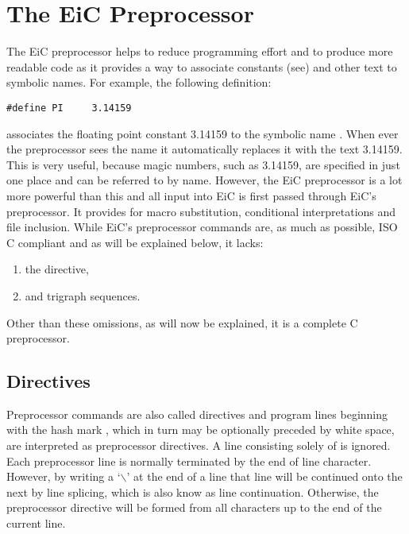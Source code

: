 \chapter{The EiC Preprocessor}
\label{chp:Preprocessor}
\label{sec:preprocessor} 


The EiC preprocessor helps to reduce programming effort and to
produce more readable code as it provides a way to associate
constants (see) and other text to symbolic names. For example,
the following definition:
\begin{production}
\begin{verbatim}
#define PI     3.14159
\end{verbatim}
\end{production}

associates the floating point constant 3.14159 to the symbolic name
. When ever the preprocessor sees the name  it automatically
replaces it with the text 3.14159. This is very useful, because magic
numbers, such as 3.14159, are specified in just
one place and can be referred to by name.  However, the EiC
preprocessor is a lot more powerful than this and all input into EiC
is first passed through EiC's preprocessor. It provides for macro
substitution, conditional interpretations and file inclusion. While
EiC's preprocessor commands are, as much as possible, ISO C compliant
and as will be explained below, it lacks:
\begin{enumerate}
\item  the  directive,
\item  and trigraph sequences.
\end{enumerate}

Other than these omissions, as will now be explained, it is a complete
C preprocessor.

\section{Directives}
\label{sec:Directives} 

Preprocessor commands are also called directives and program lines
beginning with the hash mark \T{\#}, which in turn may be optionally
preceded by white space, are interpreted as preprocessor directives. A
line consisting solely of \T{\#} is ignored. Each preprocessor line is
normally terminated by the end of line character. However, by writing
a `$\backslash$' at the end of a line that line will be continued onto
the next by line splicing, which is also know as
line continuation. Otherwise, the preprocessor directive will be
formed from all characters up to the end of the current line.

